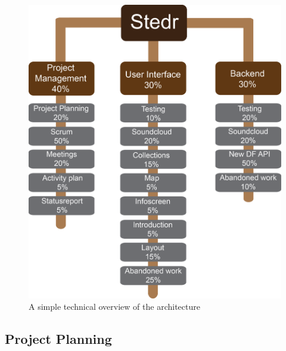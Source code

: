 \begin{figure}[h!]
\begin{center}
\includegraphics[scale=0.6]{WBS}
\caption{A simple technical overview of the architecture}
\end{center}
\end{figure}
\clearpage

\subsection{Project Planning}


